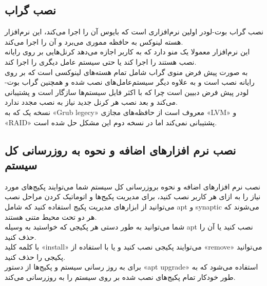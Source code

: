 \subsection{نصب گراب}
\begin{frame}{نصب گراب}
  بوت-لودر اولین نرم‌افزاری است که بایوس آن را اجرا می‌کند، این نرم‌افزار هسته لینوکس به حافظه مموری می‌برد و آن را اجرا می‌کند.\\
  این نرم‌افزار معمولا یک منو دارد که به کاربر اجازه می‌دهد کرنل‌هایی بر روی رایانه نصب هستند را اجرا کند یا حتی سیستم عامل دیگری را اجرا کند.\\
  به صورت پیش فرض منوی گراب شامل تمام هسته‌های لینوکسی است که بر روی رایانه نصب است و به علاوه دیگر سیستم‌عامل‌های نصب شده و همچنین گراب بوت-لودر پیش فرض دبیین است چرا که با اکثر فایل سیستم‌ها سازگار است و پشتیبانی می‌کند و بعد نصب هر کرنل جدید نیاز به نصب مجدد ندارد.\\
  نسخه یک که به «Grub legecy» معروف است از حافظه‌های مجازی «LVM» و «RAID» پشتیبانی نمی‌کند اما در نسخه دوم این مشکل حل شده است.\\
\end{frame}

\subsection{ نصب نرم افزارهای اضافه و نحوه به روزرسانی کل سیستم}
\begin{frame}{نصب نرم افزارهای اضافه و نحوه بروزرسانی کل سیستم}
  شما می‌توایند پکیج‌های مورد نیاز را به ازای هر کاربر نصب کنید، برای مدیریت پکیج‌ها و اتوماتیک کردن مراحل نصب می‌توانید از ابزارهای مدیریت پکیج استفاده کنید که شامل apt و synaptic می‌شوند که هر دو تحت محیط متنی هستند.\\
  شما می‌توانید به طور دستی هر پکیجی که خواستید به وسیله apt نصب کنید یا آن را حذف کنید.\\
  با کلمه کلید «install» می‌توایند پکیجی نصب کنید و یا با استفاده از «remove» می‌توانید پکیجی را حذف کنید.\\

  برای به روز رسانی سیستم و پکیج‌ها از دستور «apt upgrade» استفاده می‌شود که به طور خودکار تمام پکیج‌های نصب شده بر روی سیستم را به روزرسانی می‌کند.
\end{frame}


